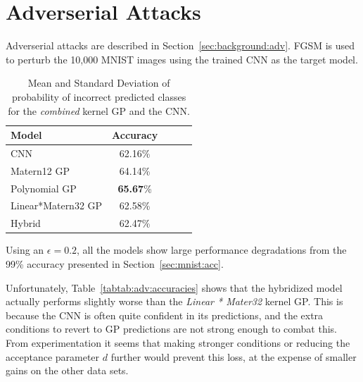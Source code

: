 \documentclass{article}
\begin{document}
\section{Adverserial Attacks}
\label{sec:adversarial}
Adverserial attacks are described in Section~\ref{sec:background:adv}. FGSM is used to perturb the 10,000 MNIST images using the trained CNN as the target model.

\begin{table}[htb]
\caption{Mean and Standard Deviation of probability of incorrect predicted classes for the \textit{combined} kernel GP and the CNN.}
\vskip 0.15in
\begin{center}
\begin{small}
\begin{sc}
\begin{tabular}{lcccr}
\toprule
Model 				& Accuracy \\
\midrule
CNN    				& 62.16\%  \\
Matern12 GP	 		& 64.14\%  \\
Polynomial GP    	& \textbf{65.67}\%  \\
Linear*Matern32 GP	& 62.58\%  \\
Hybrid    			& 62.47\%  \\
\bottomrule
\end{tabular}
\end{sc}
\end{small}
\end{center}
\vskip -0.1in
\label{tab:adv:accuracies}
\end{table}


Using an $\epsilon=0.2$, all the models show large performance degradations from the 99\% accuracy presented in Section~\ref{sec:mnist:acc}. 

Unfortunately, Table~\ref{tabtab:adv:accuracies} shows that the hybridized model actually performs slightly worse than the \textit{Linear * Mater32} kernel GP. This is because the CNN is often quite confident in its predictions, and the extra conditions to revert to GP predictions are not strong enough to combat this. From experimentation it seems that making stronger conditions or reducing the acceptance parameter $d$ further would prevent this loss, at the expense of smaller gains on the other data sets.
\end{document}

